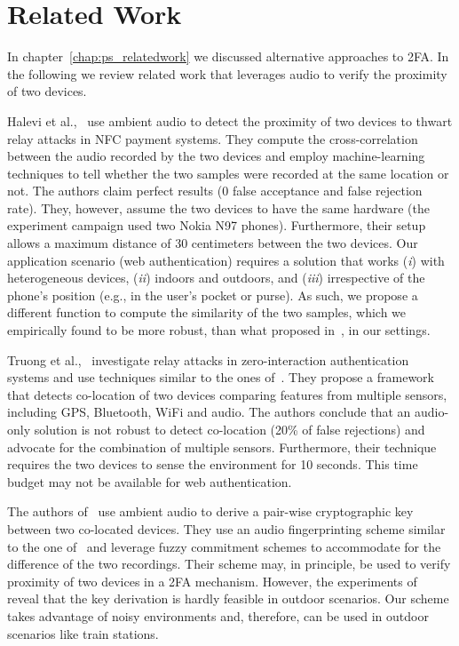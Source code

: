 
\section{Related Work}

In chapter~\ref{chap:ps_relatedwork} we discussed  alternative approaches to 2FA. In the following we review related work that leverages audio to verify the proximity of two devices.

Halevi et al.,~\cite{halevi12esorics} use ambient audio to detect the proximity of two devices to thwart relay attacks in NFC payment systems.
They compute the cross-correlation between the audio recorded by the two devices and employ machine-learning techniques to tell whether
the two samples were recorded at the same location or not.
The authors claim perfect results (0 false acceptance and false rejection rate).
They, however, assume the two devices to have the same hardware (the experiment campaign used two Nokia N97 phones).
Furthermore, their setup allows a maximum distance of 30 centimeters between the two devices.
Our application scenario (web authentication) requires a solution that works (\emph{i}) with heterogeneous devices, (\emph{ii}) indoors and outdoors, and (\emph{iii}) irrespective of the phone's position (e.g., in the user's pocket or purse).
As such, we propose a different function to compute the similarity of the two samples, which we empirically found to be more robust, than what proposed in~\cite{halevi12esorics}, in our settings.

Truong et al.,~\cite{truong14percom} investigate relay attacks in zero-interaction authentication systems and use techniques similar to the ones of~\cite{halevi12esorics}.
They propose a framework that detects co-location of two devices comparing features from multiple sensors, including GPS, Bluetooth, WiFi and audio.
The authors conclude that an audio-only solution is not robust to detect co-location (20\% of false rejections) and advocate for the combination of multiple sensors.
Furthermore, their technique requires the two devices to sense the environment for 10 seconds. This time budget may not be available for web authentication.

The authors of~\cite{schurmannS13tmc} use ambient audio to derive a pair-wise cryptographic key between two co-located devices.
They use an audio fingerprinting scheme similar to the one of~\cite{haitsma02} and leverage fuzzy commitment schemes to accommodate for the difference of the two recordings. Their scheme may, in principle, be used to verify proximity of two devices in a 2FA mechanism. 
However, the experiments of~\cite{schurmannS13tmc} reveal that
the key derivation is hardly feasible in outdoor scenarios. Our scheme takes advantage of noisy environments and, therefore, can be used in outdoor scenarios like train stations.

